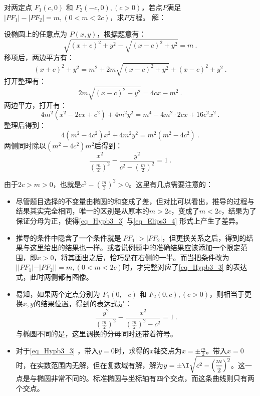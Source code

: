 \begin{example}{对两定点 $F_1(c, 0)$ 和 $F_2(-c, 0),(c>0)$，若点$P$满足$|PF_1| - |PF_2| = m,(0<m <2c)$，求$P$方程。}
解：

设椭圆上的任意点为 $P(x, y)$，根据题意有：
\begin{equation}
\sqrt{(x + c)^2 + y^2} - \sqrt{(x - c)^2 + y^2} = m~.
\end{equation}
移项后，两边平方有：
\begin{equation}
(x + c)^2 + y^2 = m^2 + 2m\sqrt{(x - c)^2 + y^2} + (x - c)^2 + y^2~.
\end{equation}
打开整理有：
\begin{equation}
2m\sqrt{(x - c)^2 + y^2}= 4cx - m^2~.
\end{equation}
两边平方，打开有：
\begin{equation}
4m^2(x^2 - 2cx+c^2) + 4m^2y^2= m^4-4m^2\cdot2cx+16c^2x^2~.
\end{equation}
整理后得到：
\begin{equation}
4(m^2 -4c^2)x^2 + 4m^2y^2= m^2(m^2-4c^2)~.
\end{equation}
两侧同时除以$(m^2-4c^2)m^2$后得到：
\begin{equation}\label{eq_Hypb3_3}
\frac{x^2}{\left(\displaystyle\frac{m}{2}\right)^2} -\frac{y^2}{\displaystyle c^2-\left(\frac{m}{2}\right)^2}=1~.
\end{equation}
\end{example}

由于$2c>m>0$，也就是$\displaystyle c^2-\left(\frac{m}{2}\right)^2>0$。这里有几点需要注意的：
\begin{itemize}
\item 尽管题目选择的不变量由椭圆的和变成了差，但对比可以看出，推导的过程与结果其实完全相同，唯一的区别是从原本的$m>2c$，变成了$m<2c$，结果为了保证分母为正，使得\autoref{eq_Hypb3_3} 与\autoref{eq_Elips3_4} 形式上产生了差异。
\item 推导的条件中隐含了一个条件就是$|PF_1| >|PF_2|$，但更换关系之后，得到的结果与这里给出的结果也一样。或者说例题中的准确结果应该添加一个限定范围，即$x>0$，将其画出之后，恰巧是在右侧的一半。而当把条件改为$||PF_1| - |PF_2|| = m,(0<m <2c)$时，才完整对应了\autoref{eq_Hypb3_3} 的表达式，此时两侧都有图像。
\item 易知，如果两个定点分别为 $F_1(0,-c)$ 和 $F_2(0,c),(c>0)$，则相当于更换$x,y$的结果位置，得到的表达式是：
\begin{equation}
\frac{y^2}{\left(\displaystyle\frac{m}{2}\right)^2}-\frac{x^2}{\displaystyle\left(\frac{m}{2}\right)^2-c^2} =1~.
\end{equation}
与椭圆不同的是，这里调换的分母同时还带着符号。
\item 对于\autoref{eq_Hypb3_3} ，带入$y=0$时，求得的$x$轴交点为$\displaystyle x=\pm\frac{m}{2}$。带入$x=0$时，在实数范围内无解，但在复数域有解，解为$\displaystyle y=\pm\I\sqrt{c^2-\left(\frac{m}{2}\right)^2}$。这一点是与椭圆非常不同的。标准椭圆与坐标轴有四个交点，而这条曲线则只有两个交点。
\end{itemize}

